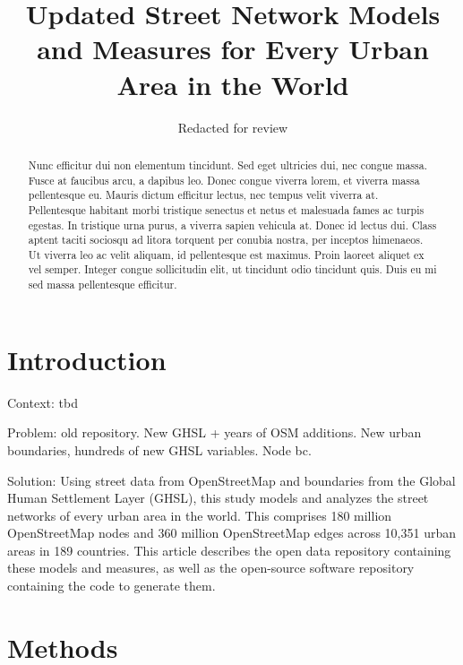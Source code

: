 \documentclass[12pt,letterpaper]{article} %
\makeatletter
\newcommand{\myname}{Geoff Boeing}
\newcommand{\myemail}{boeing@usc.edu}
\newcommand{\myaffiliation}{Department of Urban Planning and Spatial Analysis\\University of Southern California}
\newcommand{\paperdate}{April 2025}
\newcommand{\papertitle}{Updated Street Network Models and Measures for Every Urban Area in the World}
\newcommand{\papercitation}{Boeing, G. 2025. \papertitle. Under review at \textit{Journal Name}.}
\makeatother
\begin{document}
\title{\papertitle}%
\author[]{Redacted for review}%
\date{}%

\maketitle

\begin{abstract}
Nunc efficitur dui non elementum tincidunt. Sed eget ultricies dui, nec congue massa. Fusce at faucibus arcu, a dapibus leo. Donec congue viverra lorem, et viverra massa pellentesque eu. Mauris dictum efficitur lectus, nec tempus velit viverra at. Pellentesque habitant morbi tristique senectus et netus et malesuada fames ac turpis egestas. In tristique urna purus, a viverra sapien vehicula at. Donec id lectus dui. Class aptent taciti sociosqu ad litora torquent per conubia nostra, per inceptos himenaeos. Ut viverra leo ac velit aliquam, id pellentesque est maximus. Proin laoreet aliquet ex vel semper. Integer congue sollicitudin elit, ut tincidunt odio tincidunt quis. Duis eu mi sed massa pellentesque efficitur.
\vspace{1cm}
\end{abstract}


\section{Introduction}

Context: tbd

Problem: old repository. New GHSL + years of OSM additions. New urban boundaries, hundreds of new GHSL variables. Node bc.

Solution: Using street data from OpenStreetMap and boundaries from the Global Human Settlement Layer (GHSL), this study models and analyzes the street networks of every urban area in the world. This comprises 180 million OpenStreetMap nodes and 360 million OpenStreetMap edges across 10,351 urban areas in 189 countries. This article describes the open data repository containing these models and measures, as well as the open-source software repository containing the code to generate them.

\section{Methods}
\end{document}
